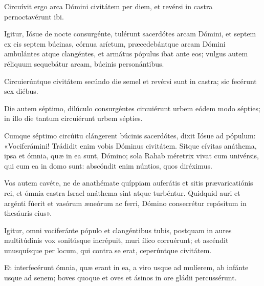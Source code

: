 {\noindent Circuívit ergo arca Dómini civitátem per diem, et revérsi in castra pernoctavérunt ibi.

\noindent Igitur, Iósue de nocte consurgénte, tulérunt sacerdótes arcam Dómini, et septem ex eis septem búcinas, córnua aríetum, præcedebántque arcam Dómini ambulántes atque clangéntes, et armátus pópulus ibat ante eos; vulgus autem réliquum sequebátur arcam, búcinis personántibus.

\noindent Circuierúntque civitátem secúndo die semel et revérsi sunt in castra; sic fecérunt sex diébus.

\noindent Die autem séptimo, dilúculo consurgéntes circuiérunt urbem eódem modo sépties; in illo die tantum circuiérunt urbem sépties.

\noindent Cumque séptimo circúitu clángerent búcinis sacerdótes, dixit Iósue ad pópulum: «Vociferámini! Trádidit enim vobis Dóminus civitátem. Sitque cívitas anáthema, ipsa et ómnia, quæ in ea sunt, Dómino; sola Rahab méretrix vivat cum univérsis, qui cum ea in domo sunt: abscóndit enim núntios, quos diréximus.

\noindent Vos autem cavéte, ne de anathémate quíppiam auferátis et sitis prævaricatiónis rei, et ómnia castra Israel anáthema sint atque turbéntur. Quidquid auri et argénti fúerit et vasórum æneórum ac ferri, Dómino consecrétur repósitum in thesáuris eius».

\noindent Igitur, omni vociferánte pópulo et clangéntibus tubis, postquam in aures multitúdinis vox sonitúsque incrépuit, muri ílico corruérunt; et ascéndit unusquísque per locum, qui contra se erat, ceperúntque civitátem.

\noindent Et interfecérunt ómnia, quæ erant in ea, a viro usque ad mulíerem, ab infánte usque ad senem; boves quoque et oves et ásinos in ore gládii percussérunt.}
\newcommand{\responsoriumi}{\pars{Responsorium 1.} \scriptura{\Rbardot{} Ps. 76, 6 \Vbardot{} ibid., 19; \textbf{H88}}

\vspace{-5mm}

\responsorium{VII}{temporalia/resp-cogitavidiesantiquos-CROCHU.gtex}{}}
